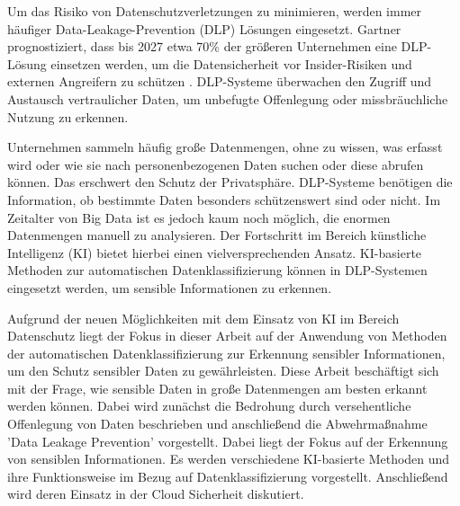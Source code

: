 Um das Risiko von Datenschutzverletzungen zu minimieren, werden immer häufiger Data-Leakage-Prevention (DLP) Lösungen eingesetzt. Gartner prognostiziert, dass bis 2027 etwa 70\% der größeren Unternehmen eine DLP-Lösung einsetzen werden, um die Datensicherheit vor Insider-Risiken und externen Angreifern zu schützen \cite{Chugh.2023}. DLP-Systeme überwachen den Zugriff und Austausch vertraulicher Daten, um unbefugte Offenlegung oder missbräuchliche Nutzung zu erkennen.

Unternehmen sammeln häufig große Datenmengen, ohne zu wissen, was erfasst wird oder wie sie nach personenbezogenen Daten suchen oder diese abrufen können. Das erschwert den Schutz der Privatsphäre. DLP-Systeme benötigen die Information, ob bestimmte Daten besonders schützenswert sind oder nicht. Im Zeitalter von Big Data ist es jedoch kaum noch möglich, die enormen Datenmengen manuell zu analysieren. Der Fortschritt im Bereich künstliche Intelligenz (KI) bietet hierbei einen vielversprechenden Ansatz. KI-basierte Methoden zur automatischen Datenklassifizierung können in DLP-Systemen eingesetzt werden, um sensible Informationen zu erkennen.

Aufgrund der neuen Möglichkeiten mit dem Einsatz von KI im Bereich Datenschutz liegt der Fokus in dieser Arbeit auf der Anwendung von Methoden der automatischen Datenklassifizierung zur Erkennung sensibler Informationen, um den Schutz sensibler Daten zu gewährleisten. Diese Arbeit beschäftigt sich mit der Frage, wie sensible Daten in große Datenmengen am besten erkannt werden können. Dabei wird zunächst die Bedrohung durch versehentliche Offenlegung von Daten beschrieben und anschließend die Abwehrmaßnahme 'Data Leakage Prevention' vorgestellt. Dabei liegt der Fokus auf der Erkennung von sensiblen Informationen. Es werden verschiedene KI-basierte Methoden und ihre Funktionsweise im Bezug auf Datenklassifizierung vorgestellt. Anschließend wird deren Einsatz in der Cloud Sicherheit diskutiert.